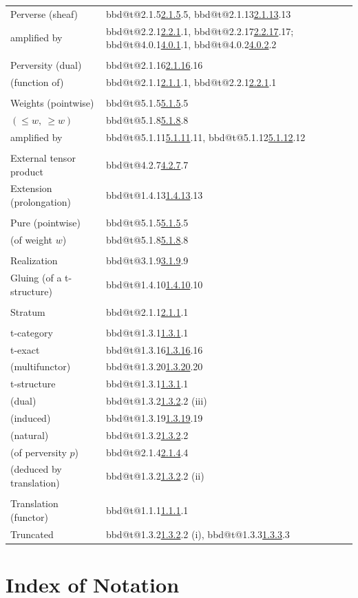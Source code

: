 \documentclass[12pt,oneside]{amsbook}
\makeatletter
\DeclareRobustCommand{\rn}[1]{%
  \ifcsname bbd@t@#1\endcsname\hyperlink{bbd:#1}{#1}\else#1\fi}
\theoremstyle{plain}
\theoremstyle{definition}
\makeatother
\begin{document}
\begin{longtable}{@{}p{}p{}@{}}
Perverse (sheaf) & \rn{2.1.5}, \rn{2.1.13}\\
\quad amplified by & \rn{2.2.1}, \rn{2.2.17}; \rn{4.0.1}, \rn{4.0.2}\\[3pt]\\
Perversity (dual) & \rn{2.1.16}\\
\quad (function of) & \rn{2.1.1}, \rn{2.2.1}\\[3pt]\\
Weights (pointwise) & \rn{5.1.5}\\
\quad $(\le w,\ \ge w)$ & \rn{5.1.8}\\
\quad amplified by & \rn{5.1.11}, \rn{5.1.12}\\[3pt]\\
External tensor product & \rn{4.2.7}\\
Extension (prolongation) & \rn{1.4.13}\\[3pt]\\
Pure (pointwise) & \rn{5.1.5}\\
\quad (of weight $w$) & \rn{5.1.8}\\[3pt]\\
Realization & \rn{3.1.9}\\
Gluing (of a t-structure) & \rn{1.4.10}\\[3pt]\\
Stratum & \rn{2.1.1}\\[3pt]\\
t-category & \rn{1.3.1}\\
t-exact & \rn{1.3.16}\\
\quad (multifunctor) & \rn{1.3.20}\\
t-structure & \rn{1.3.1}\\
\quad (dual) & \rn{1.3.2} (iii)\\
\quad (induced) & \rn{1.3.19}\\
\quad (natural) & \rn{1.3.2}\\
\quad (of perversity $p$) & \rn{2.1.4}\\
\quad (deduced by translation) & \rn{1.3.2} (ii)\\[3pt]\\
Translation (functor) & \rn{1.1.1}\\
Truncated & \rn{1.3.2} (i), \rn{1.3.3}\\
\hline
\end{longtable}

\chapter*{Index of Notation}
\end{document}
